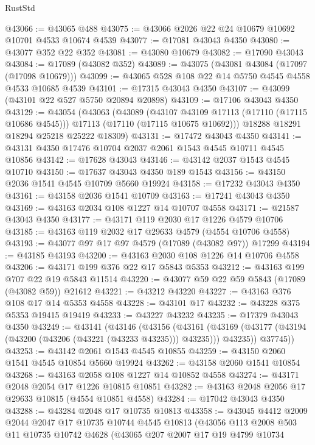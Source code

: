 \begin{lexlean}{RustStd}
\begin{coremodule}
@43066 := @43065 @488
@43075 := @43066 @2026 @22 @24 @10679 @10692 @10701 @4533 @10674 @4539
@43077 := @17081 @43043 @4350
@43080 := @43077 @352 @22 @352
@43081 := @43080 @10679
@43082 := @17090 @43043
@43084 := @17089 (@43082 @352)
@43089 := @43075 (@43081 @43084 (@17097 (@17098 @10679)))
@43099 := @43065 @528 @108 @22 @14 @5750 @4545 @4558 @4533 @10685 @4539
@43101 := @17315 @43043 @4350
@43107 := @43099 (@43101 @22 @527 @5750 @20894 @20898)
@43109 := @17106 @43043 @4350
@43129 := @43054
    (@43063
      (@43089
        (@43107 @43109 @17113 (@17110 (@17115 @10686 @4545)))
        @17113
        (@17110 (@17115 @10675 @10692)))
      @18288
      @18291
      @18294
      @25218
      @25222
      @18309)
@43131 := @17472 @43043 @4350
@43141 := @43131 @4350 @17476 @10704 @2037 @2061 @1543 @4545 @10711 @4545 @10856
@43142 := @17628 @43043
@43146 := @43142 @2037 @1543 @4545 @10710
@43150 := @17637 @43043 @4350 @189 @1543
@43156 := @43150 @2036 @1541 @4545 @10709 @5660 @19924
@43158 := @17232 @43043 @4350
@43161 := @43158 @2036 @1541 @10709
@43163 := @17241 @43043 @4350
@43169 := @43163 @2034 @108 @1227 @14 @10707 @4558
@43171 := @21587 @43043 @4350
@43177 := @43171 @119 @2030 @17 @1226 @4579 @10706
@43185 := @43163 @119 @2032 @17 @29633 @4579 (@4554 @10706 @4558)
@43193 := @43077 @97 @17 @97 @4579 (@17089 (@43082 @97)) @17299
@43194 := @43185 @43193
@43200 := @43163 @2030 @108 @1226 @14 @10706 @4558
@43206 := @43171 @199 @376 @22 @17 @5843 @5353
@43212 := @43163 @199 @707 @22 @19 @5843 @11514
@43220 := @43077 @59 @22 @59 @5843 (@17089 (@43082 @59)) @21612
@43221 := @43212 @43220
@43227 := @43163 @376 @108 @17 @14 @5353 @4558
@43228 := @43101 @17
@43232 := @43228 @375 @5353 @19415 @19419
@43233 := @43227 @43232
@43235 := @17379 @43043 @4350
@43249 := @43141
    (@43146
      (@43156
        (@43161 (@43169 (@43177 (@43194 (@43200 (@43206 (@43221 (@43233 @43235))) @43235))) @43235))
        @37745))
@43253 := @43142 @2061 @1543 @4545 @10855
@43259 := @43150 @2060 @1541 @4545 @10854 @5660 @19924
@43262 := @43158 @2060 @1541 @10854
@43268 := @43163 @2058 @108 @1227 @14 @10852 @4558
@43274 := @43171 @2048 @2054 @17 @1226 @10815 @10851
@43282 := @43163 @2048 @2056 @17 @29633 @10815 (@4554 @10851 @4558)
@43284 := @17042 @43043 @4350
@43288 := @43284 @2048 @17 @10735 @10813
@43358 := @43045
    @4412
    @2009
    @2044
    @2047
    @17
    @10735
    @10744
    @4545
    @10813
    (@43056
      @113
      @2008
      @503
      @11
      @10735
      @10742
      @4628
      (@43065
        @207
        @2007
        @17
        @19
        @4799
        @10734

\end{coremodule}
\end{lexlean}
